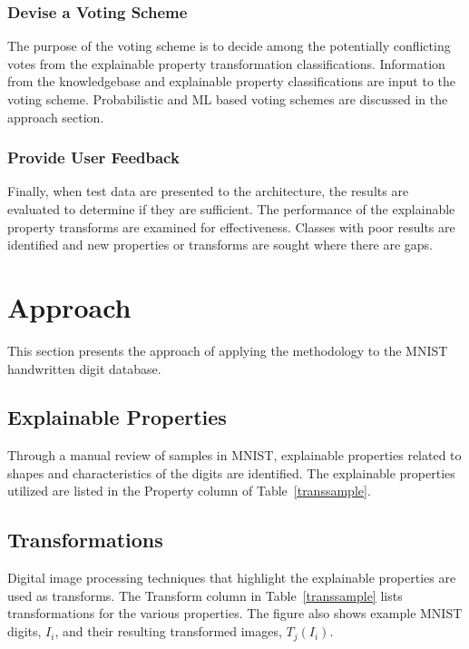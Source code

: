 \documentclass[conference]{IEEEtran}
\begin{document}
\subsubsection{Devise a Voting Scheme}
The purpose of the voting scheme is to decide among the potentially conflicting
votes from the explainable property transformation classifications.  Information
from the knowledgebase and explainable property classifications are input to the
voting scheme.  Probabilistic and ML based voting schemes are discussed in the
approach section.

\subsubsection{Provide User Feedback}
Finally, when test data are presented to the architecture, the results are
evaluated to determine if they are sufficient.  The performance of the
explainable property transforms are examined for effectiveness.  Classes with
poor results are identified and new properties or transforms are sought where
there are gaps.

\section{Approach}

This section presents the approach of applying the methodology to the MNIST
handwritten digit database. 

\subsection{Explainable Properties}

Through a manual review of samples in MNIST, explainable properties related to
shapes and characteristics of the digits are identified.  The explainable
properties utilized are listed in the Property column of
Table~\ref{transsample}.

\subsection{Transformations}
 
Digital image processing techniques that highlight the explainable properties
are used as transforms.  The Transform column in Table~\ref{transsample} lists
transformations for the various properties.  The figure also shows example MNIST
digits, $I_i$, and their resulting transformed images, $T_j(I_i)$.
\end{document}
